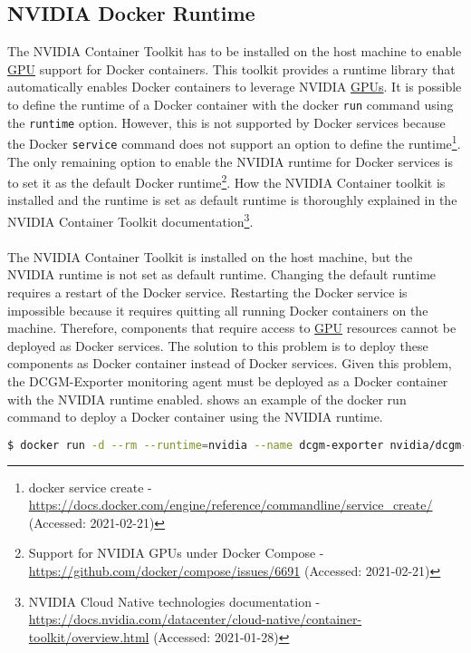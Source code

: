 \subsection{NVIDIA Docker Runtime}
The NVIDIA Container Toolkit has to be installed on the host machine to enable \hyperlink{abbr:gpu}{GPU} support for Docker containers. This toolkit provides a runtime library that automatically enables Docker containers to leverage NVIDIA \hyperlink{abbr:gpu}{GPUs}.
It is possible to define the runtime of a Docker container with the docker \texttt{run} command using the \texttt{runtime} option. However, this is not supported by Docker services because the Docker \texttt{service} command does not support an option to define the runtime\footnote{docker service create - \url{https://docs.docker.com/engine/reference/commandline/service_create/} (Accessed: 2021-02-21)}. The only remaining option to enable the NVIDIA runtime for Docker services is to set it as the default Docker runtime\footnote{Support for NVIDIA GPUs under Docker Compose - \url{https://github.com/docker/compose/issues/6691} (Accessed: 2021-02-21)}.
How the NVIDIA Container toolkit is installed and the runtime is set as default runtime is thoroughly explained in the NVIDIA Container Toolkit documentation\footnote{NVIDIA Cloud Native technologies documentation - \url{https://docs.nvidia.com/datacenter/cloud-native/container-toolkit/overview.html} (Accessed: 2021-01-28)}.

\paragraph{}
The NVIDIA Container Toolkit is installed on the host machine, but the NVIDIA runtime is not set as default runtime.
Changing the default runtime requires a restart of the Docker service. Restarting the Docker service is impossible because it requires quitting all running Docker containers on the machine. Therefore, components that require access to \hyperlink{abbr:gpu}{GPU} resources cannot be deployed as Docker services.
The solution to this problem is to deploy these components as Docker container instead of Docker services.
Given this problem, the DCGM-Exporter monitoring agent must be deployed as a Docker container with the NVIDIA runtime enabled.
 shows an example of the docker run command to deploy a Docker container using the NVIDIA runtime.
\begin{lstlisting}[label=lst:06_impl-env_prob_cmd, caption=Docker run command to deploy a container using the NVIDIA runtime, language=sh, numbers=none]
$ docker run -d --rm --runtime=nvidia --name dcgm-exporter nvidia/dcgm-exporter:latest
\end{lstlisting}

